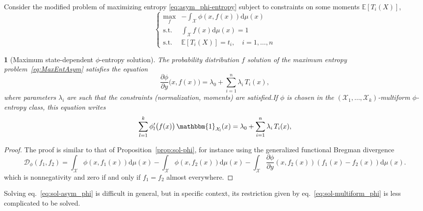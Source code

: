 \documentclass[english,sort&compress]{elsarticle}
\theoremstyle{definition}
\theoremstyle{plain}
\newtheorem{prop}{\protect\propositionname}
\theoremstyle{plain}
\providecommand{\propositionname}{Proposition}
\def\dmu{\mathrm{d}\mu}
\def\fD{\mathcal{D}}
\def\X{\mathcal{X}}
\def\un{\mathbbm{1}}
\newcommand{\Esp}[1]{\mathbb{E}\left[ #1 \right]}
\begin{document}
\

Consider the modified  problem of maximizing entropy \eqref{eq:asym_phi-entropy}
subject to constraints on some moments $\Esp{T_i(X)}$,
%
\begin{equation}\label{eq:MaxEntAsym}
\begin{cases}
\max_f & {\displaystyle - \int_\X \phi(x,f(x)) \dmu(x)}\\[5mm]
\text{s.t. } & {\displaystyle \int_\X f(x) \dmu(x) = 1}\\[5mm]
\text{s.t. } & \Esp{T_i(X)} = t_i, \quad i = 1 , \ldots , n
\end{cases}
\end{equation}

\begin{prop}[Maximum state-dependent $\phi$-entropy solution]\label{prop:sol-asym_phi}
  The   probability   distribution  $f$   solution   of   the  maximum   entropy
  problem~\eqref{eq:MaxEntAsym} satisfies the equation
  \begin{equation}\label{eq:sol-asym_phi}
  \frac{\partial \phi}{\partial y}\big(x,f(x)\big) = \lambda_0 + \sum_{i=1}^n
  \lambda_i \, T_i(x),
  \end{equation}
  where  parameters $\lambda_i$  are such  that the  constraints (normalization,
  moments) are satisfied.\newline  If $\phi$ is chosen in the  $(\X_1 , \ldots ,
  \X_k)$-multiform $\phi$-entropy class, this equation writes
  \begin{equation}\label{eq:sol-multiform_phi}
  \sum_{l=1}^k \phi_l'\big(f(x)\big) \, \un_{\X_l}(x) = \lambda_0 +
  \sum_{i=1}^n \lambda_i \, T_i(x),
  \end{equation}
\end{prop}
%
\begin{proof}
  The proof is similar to that of Proposition~\ref{prop:sol-phi}, for instance
  using the generalized functional Bregman divergence
  \[
  \fD_\phi(f_1,f_2)  = \int_\X \phi(x,f_1(x))  \dmu(x) -  \int_\X \phi(x,f_2(x))
  \dmu(x) -  \int_\X \frac{\partial \phi}{\partial y}(x,f_2(x))  \left( f_1(x) -
    f_2(x) \right) \dmu(x).
  \]
  which is nonnegativity and zero if and only if $f_1 = f_2$ almost everywhere.
\end{proof}

Solving eq.~\eqref{eq:sol-asym_phi}  is difficult  in general, but  in specific
context,  its  restriction given  by  eq.~\eqref{eq:sol-multiform_phi} is  less
complicated to be solved.


\end{document}
